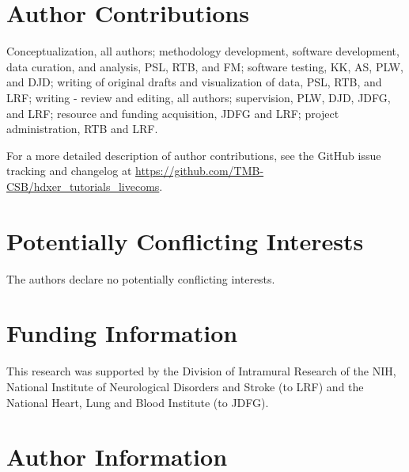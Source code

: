 \documentclass[9pt,tutorial]{livecoms}
\newcommand{\githubrepository}{\url{https://github.com/TMB-CSB/hdxer_tutorials_livecoms}}
\begin{document}
\section{Author Contributions}
%

Conceptualization, all authors; methodology development, software development, data curation, and analysis, PSL, RTB, and FM; software testing, KK, AS, PLW, and DJD; writing of original drafts and visualization of data, PSL, RTB, and LRF; writing - review and editing, all authors; supervision, PLW, DJD, JDFG, and LRF; resource and funding acquisition, JDFG and LRF; project administration, RTB and LRF.

For a more detailed description of author contributions,
see the GitHub issue tracking and changelog at \githubrepository.

\section{Potentially Conflicting Interests}

The authors declare no potentially conflicting interests.

\section{Funding Information}
This research was supported by the Division of Intramural Research of the NIH, National Institute of Neurological Disorders and Stroke (to LRF) and the National Heart, Lung and Blood Institute (to JDFG).

\section*{Author Information}
\makeorcid




\end{document}
